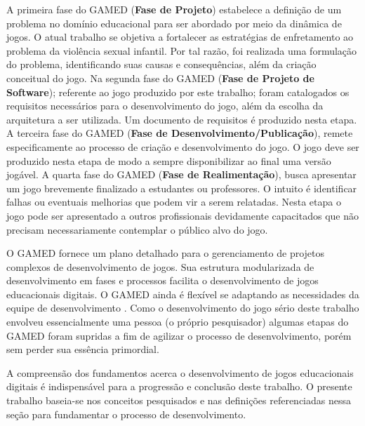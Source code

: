 A primeira fase do GAMED (\textbf{Fase de Projeto}) estabelece a definição de um problema no domínio educacional para ser abordado por meio da dinâmica de jogos. O atual trabalho se objetiva a fortalecer as estratégias de enfretamento ao problema da violência sexual infantil. Por tal razão, foi realizada uma formulação do problema, identificando suas causas e consequências, além da criação conceitual do jogo. Na segunda fase do GAMED (\textbf{Fase de Projeto de Software}); referente ao jogo produzido por este trabalho; foram catalogados os requisitos necessários para o desenvolvimento do jogo, além da escolha da arquitetura a ser utilizada. Um documento de requisitos é produzido nesta etapa. A terceira fase do GAMED (\textbf{Fase de Desenvolvimento/Publicação}), remete especificamente ao processo de criação e desenvolvimento do jogo. O jogo deve ser produzido nesta etapa de modo a sempre disponibilizar ao final uma versão jogável. A quarta fase do GAMED (\textbf{Fase de Realimentação}), busca apresentar um jogo brevemente finalizado a estudantes ou professores. O intuito é identificar falhas ou eventuais melhorias que podem vir a serem relatadas. Nesta etapa o jogo pode ser apresentado a outros profissionais devidamente capacitados que não precisam necessariamente contemplar o público alvo do jogo.

\vspace{-0.2cm}

O GAMED fornece um plano detalhado para o gerenciamento de projetos complexos de desenvolvimento de jogos. Sua estrutura modularizada de desenvolvimento em fases e processos facilita o desenvolvimento de jogos educacionais digitais. O GAMED ainda é flexível se adaptando as necessidades da equipe de desenvolvimento 
\cite{aslan2016digital}. Como o desenvolvimento do jogo sério deste trabalho envolveu essencialmente uma pessoa (o próprio pesquisador) algumas etapas do GAMED foram supridas a fim de agilizar o processo de desenvolvimento, porém sem perder sua essência primordial. 

\vspace{-0.2cm}

A compreensão dos fundamentos acerca o desenvolvimento de jogos educacionais digitais é indispensável para a progressão e conclusão deste trabalho. O presente trabalho baseia-se nos conceitos pesquisados e nas definições referenciadas nessa seção para fundamentar o processo de desenvolvimento.



